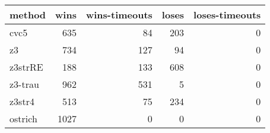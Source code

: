 \begin{tabular}{lrrrr}
\hline
 method   &   wins &   wins-timeouts &   loses &   loses-timeouts \\
\hline
 cvc5     &    635 &              84 &     203 &                0 \\
 z3       &    734 &             127 &      94 &                0 \\
 z3strRE  &    188 &             133 &     608 &                0 \\
 z3-trau  &    962 &             531 &       5 &                0 \\
 z3str4   &    513 &              75 &     234 &                0 \\
 ostrich  &   1027 &               0 &       0 &                0 \\
\hline
\end{tabular}
